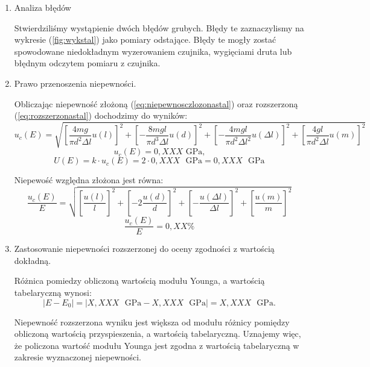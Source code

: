 \documentclass [a4paper,11pt]{article}
\begin{document}
	\begin{enumerate}[label=\alph*)]
		\item Analiza błędów
		
		Stwierdziliśmy wystąpienie dwóch błędów grubych. Błędy te zaznaczylismy na wykresie (\ref{fig:wykstal}) jako pomiary odstające. Błędy te mogły zostać spowodowane niedokładnym wyzerowaniem czujnika, wygięciami druta lub błędnym odczytem pomiaru z czujnika.
		
		\item Prawo przenoszenia niepewności.
		
		Obliczając niepewność złożoną (\ref{eq:niepewnosczlozonastal}) oraz rozszerzoną (\ref{eq:rozszerzonastal}) dochodzimy do wyników: 
		\begin{equation}
		\label{eq:niepewnosczlozonastal}
		u_c(E) = \sqrt{ \left[ \frac{4mg}{\pi d^2\Delta l}u(l) \right]^2 + \left[ -\frac{8mgl}{\pi d^3\Delta l}u(d) \right]^2 + \left[ -\frac{4mgl}{\pi d^2\Delta l^2}u(\Delta l) \right]^2 + \left[ \frac{4gl}{\pi d^2\Delta l}u(m) \right]^2}
		\end{equation}
		$$ u_c(E) = 0,XXX \text{ GPa,} $$
		\begin{equation}
		\label{eq:rozszerzonastal}
		U(E) = k\cdot u_c(E) = 2 \cdot 0,XXX \text{ }\mathrm{GPa} = 0,XXX \text{ }\mathrm{GPa}
		\end{equation}
		
		Niepewość względna złożona jest równa:
		\begin{equation}
		\label{eq:niepewnosczlozonawzglstal}
		\frac{u_c(E)}{E} = \sqrt{ \left[ \frac{u(l)}{l} \right]^2 + \left[ -2\frac{u(d)}{d} \right]^2 + \left[ -\frac{u(\Delta l)}{\Delta l} \right]^2 + \left[ \frac{u(m)}{m} \right]^2}
		\end{equation}
		$$ \frac{u_c(E)}{E} = 0,XX\% $$
		
		\item Zastosowanie niepewności rozszerzonej do oceny zgodności z wartością dokładną.
		
		Różnica pomiedzy obliczoną wartością modułu Younga, a wartością tabelaryczną wynosi:
		\begin{equation}
		\label{eq:roznicastal}
		|E - E_0| = \left|X,XXX \text{ }\mathrm{GPa} - X,XXX \text{ }\mathrm{GPa}\right| = X,XXX \text{ }\mathrm{GPa}.
		\end{equation}
		
		Niepewność rozszerzona wyniku jest większa od modułu różnicy pomiędzy obliczoną wartością przyspieszenia, a wartością tabelaryczną. Uznajemy więc, że policzona wartość modułu Younga jest zgodna z wartością tabelaryczną w zakresie wyznaczonej niepewności.
		
	\end{enumerate}
	
\end{document}

